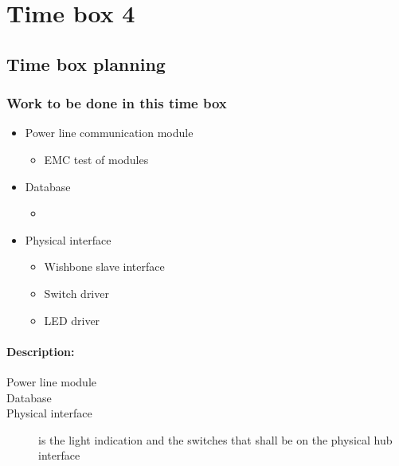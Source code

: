 \section{Time box 4}
\listoftodos
\subsection{Time box planning}
\begin{figure}[H]
	\begin{centering}
	\end{centering}
\end{figure}
\subsubsection{Work to be done in this time box}
\begin{itemize}
	\item Power line communication module
	\begin{itemize}
		\item EMC test of modules
	\end{itemize}
	\item Database
	\begin{itemize}
		\item {}
	\end{itemize}
	\item Physical interface
	\begin{itemize}
		\item Wishbone slave interface
		\item Switch driver
		\item LED driver
	\end{itemize}
\end{itemize}
\paragraph{Description:}
\begin{description}
	\item[Power line module] 
	\item[Database] 
	\item[Physical interface] is the light indication and the switches that shall be on the physical hub interface
\end{description}
